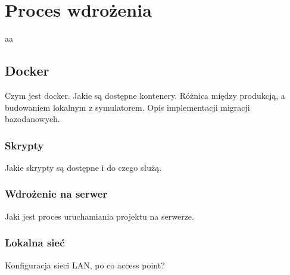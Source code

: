 
\chapter{Proces wdrożenia}
\label{cha:procesWdrozenia}

aa


\section{Docker}
\label{sec:docker}

Czym jest docker. Jakie są dostępne kontenery. Różnica między produkcją, a budowaniem lokalnym z symulatorem. Opis implementacji migracji bazodanowych.


\subsection{Skrypty}
\label{sec:skrypty}

Jakie skrypty są dostępne i do czego służą.


\subsection{Wdrożenie na serwer}
\label{sec:wdrozenieNaSerwer}

Jaki jest proces uruchamiania projektu na serwerze.


\subsection{Lokalna sieć}
\label{sec:lokalnaSiec}

Konfiguracja sieci LAN, po co access point?
